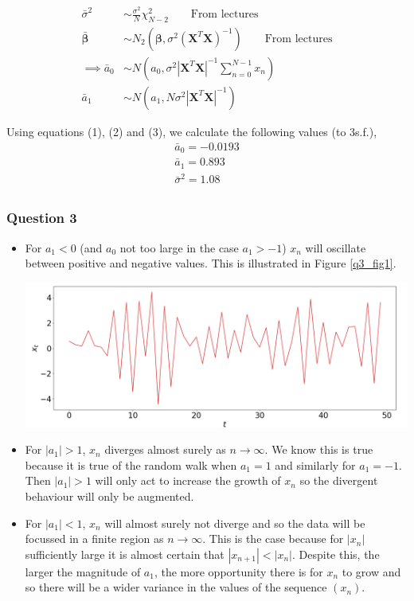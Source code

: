 \documentclass[12pt, a4paper]{article}
\begin{document}
\begin{align*}
	\bar{\sigma}^{2} & \sim \frac{\sigma^{2}}{N}\chi_{N-2}^{2} \text{ ~~~~ From lectures} \\
	\bm{\bar{\beta}} & \sim N_{2}(\bm{\beta}, \sigma^{2}(\bm{X}^{T}\bm{X})^{-1}) \text{ ~~~~ From lectures} \\
	\implies \bar{a}_{0} & \sim N\left( a_{0},  \sigma^{2}|\bm{X}^{T}\bm{X}|^{-1} \sum\limits_{n=0}^{N-1}x_{n} \right) \\
	\bar{a}_{1} & \sim N\left( a_{1},  N\sigma^{2}|\bm{X}^{T}\bm{X}|^{-1} \right)
\end{align*}

Using equations (1), (2) and (3), we calculate the following values (to 3s.f.),
\begin{align*}
	\bar{a}_{0} = -0.0193 \\
	\bar{a}_{1} = 0.893 ~ \\
	\bar{\sigma}^{2} = 1.08 ~~ \\
\end{align*}


\subsubsection*{Question 3}

\begin{itemize}[topsep = 8pt, leftmargin = *]
	\itemsep 0em
	\item For $a_{1} < 0$ (and $a_{0}$ not too large in the case $a_{1}>-1$) $x_{n}$ will oscillate between positive and negative values. This is illustrated in Figure \ref{q3_fig1}. \vspace{0.3cm}\\
	\begin{minipage}{\textwidth}
		\centering
		\includegraphics[width=0.8\linewidth]{q3_fig1}
		\label{q3_fig1}
	\end{minipage}
	\item For $|a_{1}|>1$, $x_{n}$ diverges almost surely as $n\to\infty$. We know this is true because it is true of the random walk when $a_{1}=1$ and similarly for $a_{1}=-1$. Then $|a_{1}|>1$ will only act to increase the growth of $x_{n}$ so the divergent behaviour will only be augmented.
	\item For $|a_{1}|<1$, $x_{n}$ will almost surely not diverge and so the data will be focussed in a finite region as $n\to\infty$. This is the case because for $|x_{n}|$ sufficiently large it is almost certain that $|x_{n+1}|<|x_{n}|$. Despite this, the larger the magnitude of $a_{1}$, the more opportunity there is for $x_{n}$ to grow and so there will be a wider variance in the values of the sequence $(x_{n})$.
\end{itemize}
\end{document}
